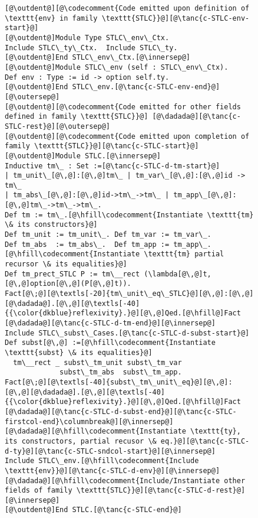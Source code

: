 \begin{figure}
\begin{minipage}{\textwidth}
\begin{multicols}{2}
\begin{lstlisting}
[@\outdent@][@\codecomment{Code emitted upon definition of \texttt{env} in family \texttt{STLC}}@][@\tanc{c-STLC-env-start}@]
[@\outdent@]Module Type STLC\_env\_Ctx.
Include STLC\_ty\_Ctx.  Include STLC\_ty.
[@\outdent@]End STLC\_env\_Ctx.[@\innersep@]
[@\outdent@]Module STLC\_env (self : STLC\_env\_Ctx).
Def env : Type := id -> option self.ty.
[@\outdent@]End STLC\_env.[@\tanc{c-STLC-env-end}@][@\outersep@]
[@\outdent@][@\codecomment{Code emitted for other fields defined in family \texttt{STLC}}@] [@\dadada@][@\tanc{c-STLC-rest}@][@\outersep@]
[@\outdent@][@\codecomment{Code emitted upon completion of family \texttt{STLC}}@][@\tanc{c-STLC-start}@]
[@\outdent@]Module STLC.[@\innersep@]
Inductive tm\_ : Set :=[@\tanc{c-STLC-d-tm-start}@]
| tm_unit\_[@\,@]:[@\,@]tm\_ | tm_var\_[@\,@]:[@\,@]id -> tm\_
| tm_abs\_[@\,@]:[@\,@]id->tm\_->tm\_ | tm_app\_[@\,@]:[@\,@]tm\_->tm\_->tm\_.
Def tm := tm\_.[@\hfill\codecomment{Instantiate \texttt{tm} \& its constructors}@]
Def tm_unit := tm_unit\_. Def tm_var := tm_var\_.
Def tm_abs  := tm_abs\_.  Def tm_app := tm_app\_.
[@\hfill\codecomment{Instantiate \texttt{tm} partial recursor \& its equalities}@]
Def tm_prect_STLC P := tm\__rect (\lambda[@\,@]t,[@\,@]option[@\,@](P[@\,@]t)).
Fact[@\;@][@\textls[-20]{tm\_unit\_eq\_STLC}@][@\,@]:[@\,@][@\dadada@].[@\,@][@\textls[-40]{{\color{dkblue}reflexivity}.}@][@\,@]Qed.[@\hfill@]Fact [@\dadada@][@\tanc{c-STLC-d-tm-end}@][@\innersep@]
Include STLC\_subst\_Cases.[@\tanc{c-STLC-d-subst-start}@]
Def subst[@\,@] :=[@\hfill\codecomment{Instantiate \texttt{subst} \& its equalities}@]
  tm\__rect _ subst\_tm_unit subst\_tm_var
             subst\_tm_abs  subst\_tm_app.
Fact[@\;@][@\textls[-40]{subst\_tm\_unit\_eq}@][@\,@]:[@\,@][@\dadada@].[@\,@][@\textls[-40]{{\color{dkblue}reflexivity}.}@][@\,@]Qed.[@\hfill@]Fact [@\dadada@][@\tanc{c-STLC-d-subst-end}@][@\tanc{c-STLC-firstcol-end}\columnbreak@][@\innersep@]
[@\dadada@][@\hfill\codecomment{Instantiate \texttt{ty}, its constructors, partial recusor \& eq.}@][@\tanc{c-STLC-d-ty}@][@\tanc{c-STLC-sndcol-start}@][@\innersep@]
Include STLC\_env.[@\hfill\codecomment{Include \texttt{env}}@][@\tanc{c-STLC-d-env}@][@\innersep@]
[@\dadada@][@\hfill\codecomment{Include/Instantiate other fields of family \texttt{STLC}}@][@\tanc{c-STLC-d-rest}@][@\innersep@]
[@\outdent@]End STLC.[@\tanc{c-STLC-end}@]
\end{lstlisting}


\end{multicols}
\end{minipage}
\end{figure}
